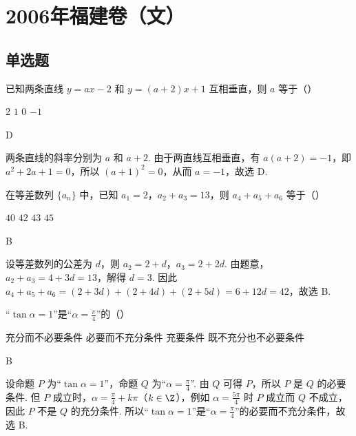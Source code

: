 \chapter{2006年福建卷（文）}
\section{单选题}
\begin{problem}
已知两条直线 \(y = ax - 2\) 和 \(y = (a + 2)x + 1\) 互相垂直，则 \(a\) 等于（\quad）

\choices
    {\(2\)}
    {\(1\)}
    {\(0\)}
    {\(-1\)}
\end{problem}

\begin{answer}
D
\end{answer}

\begin{solution}
两条直线的斜率分别为 \(a\) 和 \(a+2\). 由于两直线互相垂直，有
\(a(a+2)=-1\)，即 \(a^2+2a+1=0\)，所以 \((a+1)^2=0\)，从而 \(a=-1\)，故选 D.
\end{solution}

\begin{problem}
在等差数列 \(\{a_n\}\) 中，已知 \(a_1 = 2\)，\(a_2 + a_3 = 13\)，则 \(a_4 + a_5 + a_6\) 等于（\quad）

\choices
    {\(40\)}
    {\(42\)}
    {\(43\)}
    {\(45\)}
\end{problem}

\begin{answer}
B
\end{answer}

\begin{solution}
设等差数列的公差为 \(d\)，则 \(a_2=2+d\)，\(a_3=2+2d\). 由题意，
\(a_2+a_3=4+3d=13\)，解得 \(d=3\). 因此
\(a_4+a_5+a_6=(2+3d)+(2+4d)+(2+5d)=6+12d=42\)，故选 B.
\end{solution}

\begin{problem}
“\(\tan \alpha = 1\)”是“\(\alpha = \frac{\pi}{4}\)”的（\quad）

\choices
    {充分而不必要条件}
    {必要而不充分条件}
    {充要条件}
    {既不充分也不必要条件}
\end{problem}

\begin{answer}
B
\end{answer}

\begin{solution}
设命题 \(P\) 为“\(\tan\alpha=1\)”，命题 \(Q\) 为“\(\alpha=\frac{\pi}{4}\)”. 由 \(Q\) 可得 \(P\)，所以 \(P\) 是 \(Q\) 的必要条件. 但 \(P\) 成立时，\(\alpha=\frac{\pi}{4}+k\pi\)（\(k\in\Z\)），例如 \(\alpha=\frac{5\pi}{4}\) 时 \(P\) 成立而 \(Q\) 不成立，因此 \(P\) 不是 \(Q\) 的充分条件. 所以“\(\tan\alpha=1\)”是“\(\alpha=\frac{\pi}{4}\)”的必要而不充分条件，故选 B.
\end{solution}

